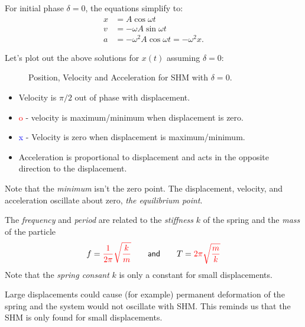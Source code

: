 For initial phase $\delta = 0$, the equations simplify to:\begin{subequations}
\begin{align}
x &= A \cos \omega t\\
v &= -\omega A \sin \omega t\\
a &= -\omega^2 A \cos \omega t = -\omega^2 x. \label{a_delta0}
\end{align}
\end{subequations}

\pagebreak
Let's plot out the above solutions for $x(t)$ assuming $\delta = 0$:

\begin{figure*}[h!]
\caption{Position, Velocity and Acceleration for SHM with $\delta = 0$.}
\end{figure*} 
\begin{itemize}
\item Velocity is $\pi/2$ out of phase with displacement. 
\item \textcolor{red}{o} - velocity is maximum/minimum when displacement is zero. 
\item \textcolor{blue}{x} - Velocity is zero when displacement is maximum/minimum. 
\item Acceleration is proportional to displacement and acts in the opposite direction to the displacement.
\end{itemize}

Note that the \emph{minimum} isn't the zero point. The displacement, velocity, and acceleration oscillate about zero, \emph{the equilibrium point}. 

The \emph{frequency} and \emph{period} are related to the \emph{stiffness} $k$ of the spring and the \emph{mass} of the particle
\begin{align}
f = \textcolor{red}{\frac{1}{2\pi} \sqrt{\frac{k}{m}}} \qquad \textsf{and} \qquad T = \textcolor{red}{2\pi \sqrt{\frac{m}{k}}}
\end{align}
Note that the \emph{spring consant} $k$ is only a constant for small displacements. 

Large displacements could cause (for example) permanent deformation of the spring and the system would not oscillate with SHM. This reminds us that the SHM is only found for small displacements. 

